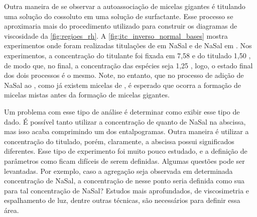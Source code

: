 		Outra maneira de se observar a autoassociação de micelas gigantes é titulando uma solução do cossoluto em uma solução de surfactante. Esse processo se aproximaria mais do procedimento utilizado para construir os diagramas de viscosidade da \autoref{fig:regioes_rh}.	A \autoref{fig:itc_inverso_normal_bases} mostra experimentos onde foram realizadas titulações de \TTAB{} em NaSal e de NaSal em \TTAB{}. Nos experimentos, a concentração do titulante foi fixada em 7,58 \mM{} e do titulado 1,50 \mM{}, de modo que, no final, a concentração das espécies seja 1,25 \mM{}, logo, o estado final dos dois processos é o mesmo. Note, no entanto, que no processo de adição de NaSal ao \TTAB, como já existem micelas de \TTAB, é esperado que ocorra a formação de micelas mistas antes da formação de micelas gigantes.
		
		Um problema com esse tipo de análise é determinar como exibir esse tipo de dado. É possível tanto utilizar a concentração de \TTAB{} quanto de NaSal na abscissa, mas isso acaba comprimindo um dos entalpogramas. Outra maneira é utilizar a concentração do titulado, porém, claramente, a abscissa possui significados diferentes. Esse tipo de experimento foi muito pouco estudado, e a definição de parâmetros como \cwlm{} ficam difíceis de serem definidas. Algumas questões pode ser levantadas. Por exemplo, caso a agregação seja observada em determinada concentração de NaSal, a concentração de \TTAB{} nesse ponto seria definida como sua \cwlm{} para tal concentração de NaSal? Estudos mais aprofundados, de viscosimetria e espalhamento de luz, dentre outras técnicas, são necessários para definir essa área.
		
